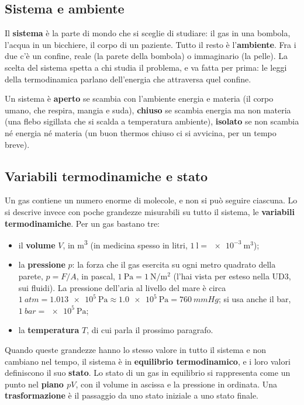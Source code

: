 \subsection{Sistema e ambiente}

Il \textbf{sistema} è la parte di mondo che si sceglie di studiare: il gas in una bombola, l'acqua in un bicchiere, il corpo di un paziente. Tutto il resto è l'\textbf{ambiente}. Fra i due c'è un confine, reale (la parete della bombola) o immaginario (la pelle). La scelta del sistema spetta a chi studia il problema, e va fatta per prima: le leggi della termodinamica parlano dell'energia che attraversa quel confine.

Un sistema è \textbf{aperto} se scambia con l'ambiente energia e materia (il corpo umano, che respira, mangia e suda), \textbf{chiuso} se scambia energia ma non materia (una flebo sigillata che si scalda a temperatura ambiente), \textbf{isolato} se non scambia né energia né materia (un buon thermos chiuso ci si avvicina, per un tempo breve).

\subsection{Variabili termodinamiche e stato}

Un gas contiene un numero enorme di molecole, e non si può seguire ciascuna. Lo si descrive invece con poche grandezze misurabili su tutto il sistema, le \textbf{variabili termodinamiche}. Per un gas bastano tre:
\begin{itemize}
  \item il \textbf{volume} $V$, in \si{\metre\cubed} (in medicina spesso in litri, $\SI{1}{\litre} = \SI{e-3}{\metre\cubed}$);
  \item la \textbf{pressione} $p$: la forza che il gas esercita su ogni metro quadrato della parete, $p = F/A$, in pascal, $\SI{1}{\pascal} = \SI{1}{\newton\per\metre\squared}$ (l'hai vista per esteso nella UD3, sui fluidi). La pressione dell'aria al livello del mare è circa $\SI{1}{atm} = \SI{1,013e5}{\pascal} \approx \SI{1,0e5}{\pascal} = \SI{760}{mmHg}$; si usa anche il bar, $\SI{1}{bar} = \SI{e5}{\pascal}$;
  \item la \textbf{temperatura} $T$, di cui parla il prossimo paragrafo.
\end{itemize}
Quando queste grandezze hanno lo stesso valore in tutto il sistema e non cambiano nel tempo, il sistema è in \textbf{equilibrio termodinamico}, e i loro valori definiscono il suo \textbf{stato}. Lo stato di un gas in equilibrio si rappresenta come un punto nel \textbf{piano $pV$}, con il volume in ascissa e la pressione in ordinata. Una \textbf{trasformazione} è il passaggio da uno stato iniziale a uno stato finale.

